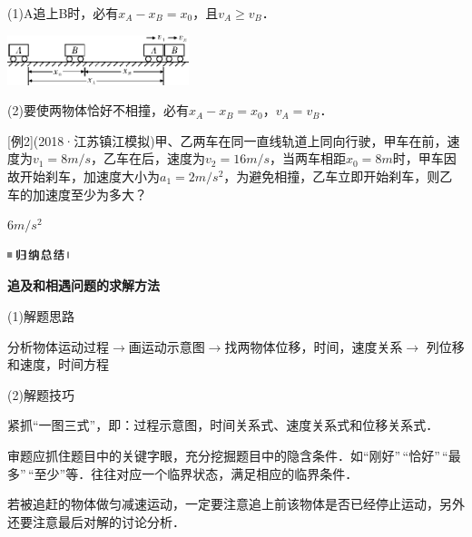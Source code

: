 (1)A追上B时，必有$x_A-x_B=x_0$，且$v_A\ge v_B$．

\begin{center}\includegraphics[width=2.08333in,height=0.57292in]{media/image35.png}\end{center}

(2)要使两物体恰好不相撞，必有$x_A-x_B=x_0$，$v_A=v_B$．

{[}例2{]}(2018·江苏镇江模拟)甲、乙两车在同一直线轨道上同向行驶，甲车在前，速度为$v_1=8m/s$，乙车在后，速度为$v_2=16 m/s$，当两车相距$x_0=8m$时，甲车因故开始刹车，加速度大小为$a_1=2m/s^2$，为避免相撞，乙车立即开始刹车，则乙车的加速度至少为多大？
\begin{solution}
	$6m/s^2$
\end{solution}


\begin{center}\includegraphics[width=0.70833in,height=0.125in]{media/image13.png}

\textbf{追及和相遇问题的求解方法}
\end{center}


(1)解题思路

分析物体运动过程$\rightarrow$画运动示意图$\rightarrow$找两物体位移，时间，速度关系$\rightarrow$ 列位移和速度，时间方程

(2)解题技巧

紧抓``一图三式''，即：过程示意图，时间关系式、速度关系式和位移关系式．

审题应抓住题目中的关键字眼，充分挖掘题目中的隐含条件．如``刚好''\,``恰好''\,``最多''\,``至少''等．往往对应一个临界状态，满足相应的临界条件．

若被追赶的物体做匀减速运动，一定要注意追上前该物体是否已经停止运动，另外还要注意最后对解的讨论分析．
\newpage
